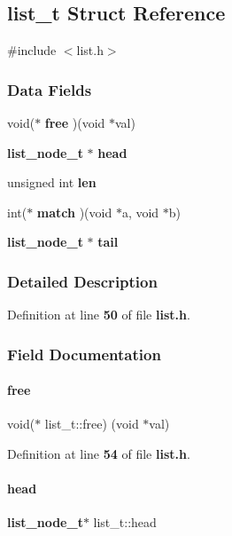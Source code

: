 \subsection{list\+\_\+t Struct Reference}
\label{structlist__t}


{\ttfamily \#include $<$list.\+h$>$}

\subsubsection*{Data Fields}
\begin{DoxyCompactItemize}
\item 
void($\ast$ \textbf{ free} )(void $\ast$val)
\item 
\textbf{ list\+\_\+node\+\_\+t} $\ast$ \textbf{ head}
\item 
unsigned int \textbf{ len}
\item 
int($\ast$ \textbf{ match} )(void $\ast$a, void $\ast$b)
\item 
\textbf{ list\+\_\+node\+\_\+t} $\ast$ \textbf{ tail}
\end{DoxyCompactItemize}


\subsubsection{Detailed Description}


Definition at line \textbf{ 50} of file \textbf{ list.\+h}.



\subsubsection{Field Documentation}
\mbox{\label{structlist__t_adbc5f9e0707a09a027c89218ff0a8f69}} 
\paragraph{free}
{\footnotesize\ttfamily void($\ast$ list\+\_\+t\+::free) (void $\ast$val)}



Definition at line \textbf{ 54} of file \textbf{ list.\+h}.

\mbox{\label{structlist__t_a93ef6d995af96e73e226dc2b8a7232aa}} 
\paragraph{head}
{\footnotesize\ttfamily \textbf{ list\+\_\+node\+\_\+t}$\ast$ list\+\_\+t\+::head}



